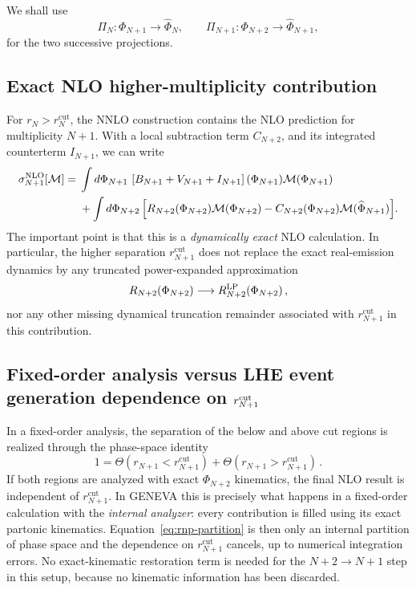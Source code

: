 \documentclass[11pt]{article}
\newcommand{\rn}{r_N}
\newcommand{\rnp}{r_{N+1}}
\newcommand{\cut}{\mathrm{cut}}
\newcommand{\Ph}{\Phi}
\newcommand{\Mcal}{\mathcal{M}}
\begin{document}
We shall use
\begin{equation}
\Pi_N:\Ph_{N+1}\to\widehat\Ph_N,
\qquad
\Pi_{N+1}:\Ph_{N+2}\to\widehat\Ph_{N+1},
\label{eq:projection-maps}
\end{equation}
for the two successive projections.

\subsection{Exact NLO higher-multiplicity contribution}

For \(\rn>\rn^{\cut}\), the NNLO construction contains the NLO prediction for multiplicity \(N+1\).
With a local subtraction term \(C_{N+2}\), and its integrated counterterm $I_{N+1}$, we can write
\begin{align}
\sigma_{N+1}^{\rm NLO}[\Mcal]
={}&
\int d\Ph_{N+1}\,
\left[
B_{N+1}+V_{N+1}+I_{N+1}
\right](\Ph_{N+1})
\Mcal(\Ph_{N+1})
\nonumber\\
&+
\int d\Ph_{N+2}\,
\Bigl[
R_{N+2}(\Ph_{N+2})\Mcal(\Ph_{N+2})
-
C_{N+2}(\Ph_{N+2})\Mcal(\widehat\Ph_{N+1})
\Bigr].
\label{eq:nlo-nplus1}
\end{align}
The important point is that this is a {\it dynamically exact} NLO calculation.
In particular, the higher separation \(\rnp^{\cut}\) does not replace the exact real-emission dynamics by any
truncated power-expanded approximation 
\begin{equation}
R_{N+2} (\Ph_{N+2}) \longrightarrow R_{N+2}^{\rm LP}(\Ph_{N+2})\,,
\label{eq:no-lp-rnp}
\end{equation} nor any other missing dynamical truncation remainder associated with
\(\rnp^{\cut}\) 
in this contribution.  

\subsection{Fixed-order analysis versus LHE event generation dependence on \texorpdfstring{\(r_{N+1}^{\rm cut}\)}{rN+1cut}}

In a fixed-order analysis, the separation of the below and above cut regions is realized through the phase-space identity
\begin{equation}
1=
\Theta\!\left(\rnp<\rnp^{\cut}\right)
+
\Theta\!\left(\rnp>\rnp^{\cut}\right)\,.
\label{eq:rnp-partition}
\end{equation}
If both regions are analyzed with exact \(\Ph_{N+2}\) kinematics, the final NLO result is independent of
\(\rnp^{\cut}\).
In GENEVA this is precisely what happens in a fixed-order calculation with the
\emph{internal analyzer}: every contribution is filled using its exact partonic kinematics.
Equation~\eqref{eq:rnp-partition} is then only an internal partition of phase space and the dependence on
\(\rnp^{\cut}\) cancels, up to numerical integration errors. No exact-kinematic restoration term is needed
for the \(N+2\to N+1\) step in this setup, because no kinematic information has been discarded.
\end{document}
